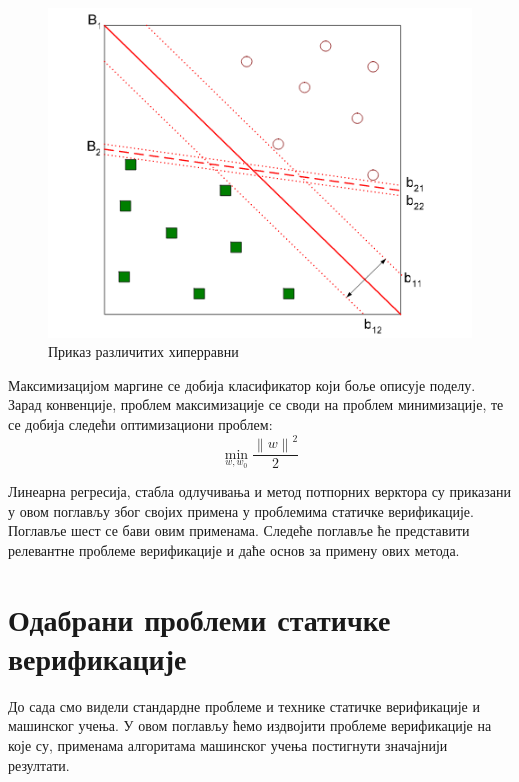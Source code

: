 \documentclass[a4paper]{article}
\newcommand{\norm}[1]{\left\lVert#1\right\rVert}
\begin{document}
{\begin{figure}[h!]
\begin{center}
\includegraphics[scale=0.4]{./slike/svm.png}
\end{center}
\caption{Приказ различитих хиперравни}
\label{fig:svm}
\end{figure}

Максимизацијом маргине се добија класификатор који боље описује поделу. Зарад конвенције, проблем максимизације се своди на проблем минимизације, те се добија следећи оптимизациони проблем:
\begin{equation}
    \min_{w, w_0} \frac{ {\norm{w}}^2 }{2}
\end{equation}


Линеарна регресија, стабла одлучивања и метод потпорних верктора су приказани у овом поглављу због својих примена у проблемима статичке верификације. Поглавље шест се бави овим применама. Следеће поглавље ће представити релевантне проблеме верификације и даће основ за примену ових метода.

\section{Одабрани проблеми статичке верификације}
До сада смо видели стандардне проблеме и технике статичке верификације и машинског учења. У овом поглављу ћемо издвојити проблеме верификације на које су, применама алгоритама машинског учења постигнути значајнији резултати.


}
\end{document}
